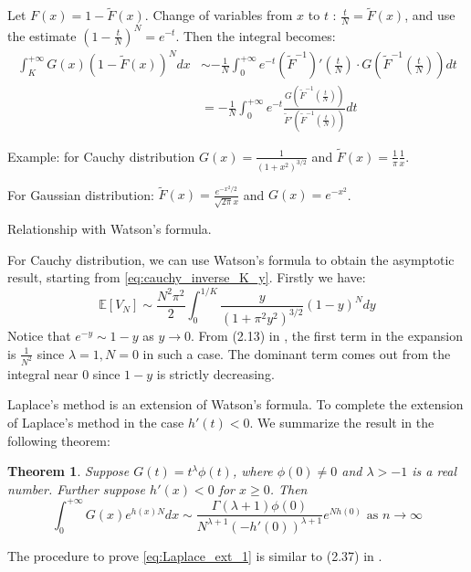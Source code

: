 \documentclass{article}
\newtheorem{theorem}{Theorem}
\def\E{\mathbb{E}}
\begin{document}
Let $F(x)=1-\widetilde{F}(x)$.
Change of variables from $x$ to $t$
: $\frac{t}{N} = \widetilde{F}(x)$,
and use the estimate $(1-\frac{t}{N})^N
=e^{-t}$.
Then the integral becomes:
\begin{align*}
    \int_K^{+\infty} G(x)
(1-\widetilde{F}(x))^N dx
&\sim -\frac{1}{N}\int_0^{+\infty}
e^{-t} (\widetilde{F}^{-1})'(\frac{t}{N})
\cdot G(\widetilde{F}^{-1}(\frac{t}{N}))dt \\
&=
-\frac{1}{N}\int_0^{+\infty}
e^{-t} 
\frac
{G(\widetilde{F}^{-1}(\frac{t}{N}))
}
{
\widetilde{F}'
\left(\widetilde{F}^{-1}(\frac{t}{N})
\right)
}dt 
\end{align*}

Example: for Cauchy distribution $G(x)=\frac{1}{(1+x^2)^{3/2}}$
and $\widetilde{F}(x)
= \frac{1}{\pi} \frac{1}{x}$.

For Gaussian distribution:
$\widetilde{F}(x)=\frac{e^{-x^2/2}}{\sqrt{2\pi}x}$
and $G(x)=e^{-x^2}$.

Relationship with Watson's formula.

For Cauchy distribution, we can use Watson's formula
to obtain the asymptotic result, starting from
\eqref{eq:cauchy_inverse_K_y}.
Firstly we have:
\begin{equation}
    \E[V_N] \sim \frac{N^2 \pi^2}{2}\int_{0}^{1/K}
    \frac{y}{(1+\pi^2 y^2)^{3/2}}
    \left(1-y\right)^{N}dy
\end{equation}
Notice that $e^{-y} \sim 1-y$ as $y\to 0$.
From (2.13) in \cite{murray2012asymptotic},
the first term in the expansion is $\frac{1}{N^2}$
since $\lambda=1, N=0$ in such a case. The dominant term
comes out from the integral near 0 since $1-y$ is strictly
decreasing.

Laplace's method is an extension of Watson's formula.
To complete the extension of Laplace's method in the case $h'(t)<0$.
We summarize the result in the following theorem:
\begin{theorem}
Suppose $G(t) = t^{\lambda}
\phi(t)$, where $\phi(0)\neq 0$
and $\lambda>-1$ is a real number.
Further suppose $h'(x)<0$ for $x\geq 0$.
Then
\begin{equation}\label{eq:Laplace_ext_1}
    \int_0^{+\infty} G(x) e^{h(x)N} dx
    \sim \frac{\Gamma(\lambda+1)
    \phi(0)}{N^{\lambda+1} (-h'(0))^{\lambda+1}}  e^{Nh(0)}     
    \textrm{ as } n \to \infty
\end{equation}
\end{theorem}
The procedure to prove
\eqref{eq:Laplace_ext_1} is similar to (2.37)
in \cite{murray2012asymptotic}.
\end{document}
